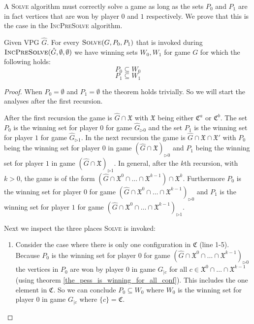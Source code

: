 A \textsc{Solve} algorithm must correctly solve a game as long as the sets $P_0$ and $P_1$ are in fact vertices that are won by player $0$ and $1$ respectively. We prove that this is the case in the \textsc{IncPreSolve} algorithm.
\begin{theorem}
	Given VPG $\hat{G}$. For every $\textsc{Solve}(G,P_0,P_1)$ that is invoked during $\textsc{IncPreSolve}(\hat{G},\emptyset,\emptyset)$ we have winning sets $W_0,W_1$ for game $G$ for which the following holds:
	\[ P_0 \subseteq  W_0 \]
	\[ P_1 \subseteq  W_1 \]
	\begin{proof}
		When $P_0 = \emptyset$ and $P_1 = \emptyset$ the theorem holds trivially. So we will start the analyses after the first recursion. 
		
		After the first recursion the game is $\hat{G} \cap \mathfrak{X}$ with $\mathfrak{X}$ being either $\mathfrak{C}^a$ or $\mathfrak{C}^b$. The set $P_0$ is the winning set for player $0$ for game $\hat{G}_{\triangleright0}$ and the set $P_1$ is the winning set for player $1$ for game $\hat{G}_{\triangleright1}$. In the next recursion the game is $\hat{G} \cap \mathfrak{X} \cap \mathfrak{X}'$ with $P_0$ being the winning set for player $0$ in game $(\hat{G} \cap \mathfrak{X})_{\triangleright0}$ and $P_1$ being the winning set for player $1$ in game $(\hat{G} \cap \mathfrak{X})_{\triangleright1}$. In general, after the $k$th recursion, with $k > 0$, the game is of the form  $(\hat{G} \cap \mathfrak{X}^0 \cap \dots \cap \mathfrak{X}^{k-1}) \cap \mathfrak{X}^k$. Furthermore $P_0$ is the winning set for player $0$ for game $(\hat{G} \cap \mathfrak{X}^0 \cap \dots \cap \mathfrak{X}^{k-1})_{\triangleright0}$ and $P_1$ is the winning set for player $1$ for game $(\hat{G} \cap \mathfrak{X}^0 \cap \dots \cap \mathfrak{X}^{k-1})_{\triangleright1}$.
		
		Next we inspect the three places \textsc{Solve} is invoked:
		\begin{enumerate}
			\item Consider the case where there is only one configuration in $\mathfrak{C}$ (line 1-5). Because $P_0$ is the winning set for player $0$ for game $(\hat{G} \cap \mathfrak{X}^0 \cap \dots \cap \mathfrak{X}^{k-1})_{\triangleright0}$ the vertices in $P_0$ are won by player $0$ in game $G_{|c}$ for all $c \in \mathfrak{X}^0 \cap \dots \cap \mathfrak{X}^{k-1}$ (using theorem \ref{the_pess_is_winning_for_all_conf}). This includes the one element in $\mathfrak{C}$. So we can conclude $P_0 \subseteq W_0$ where $W_0$ is the winning set for player $0$ in game $G_{|c}$ where $\{c\} = \mathfrak{C}$.
			

\end{enumerate}
\end{proof}
\end{theorem}
